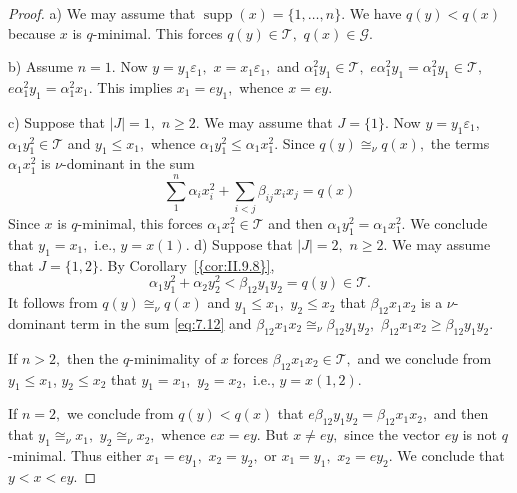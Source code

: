 \documentclass [12pt,a4paper,reqno]{amsart}
\begin{document}
\begin{proof} a) We may assume that ${\operatorname{supp}} (x)=\{1,\dots,n\}.$ We have $q(y)<q(x)$ because $x$ is $q$-minimal. This forces $q(y)\in {\mathcal T},$ $q(x)\in{\mathcal G}.$ {\vskip 1.5mm \noindent}

b) Assume $n=1.$ Now $y=y_1{\varepsilon}_1,$ $x=x_1{\varepsilon}_1,$ and ${\alpha}_1^2y_1\in {\mathcal T} ,$ $e{\alpha}_1^2y_1={\alpha}_1^2y_1\in{\mathcal T},$ $e{\alpha}_1^2y_1={\alpha}_1^2x_1.$ This implies $x_1=ey_1,$ whence $x=ey.$
{\vskip 1.5mm \noindent}

c) Suppose that $| J |=1,$ $n\ge 2.$ We may assume that $J=\{1\}.$ Now $y=y_1{\varepsilon}_1,$ ${\alpha}_1y_1^2\in{\mathcal T}$ and $y_1\le x_1,$ whence ${\alpha}_1y_1^2\le {\alpha}_1x_1^2.$ Since $q(y)\cong_\nu q(x),$ the terms ${\alpha}_1x_1^2$ is $\nu$-dominant in the sum
\begin{equation}\label{eq:7.12}
\sum_1^n{\alpha}_ix_i^2+\sum_{i<j}{\beta}_{ij}x_ix_j=q(x)
\end{equation}
Since $x$ is $q$-minimal, this forces ${\alpha}_1x_1^2\in{\mathcal T}$ and then ${\alpha}_1y_1^2={\alpha}_1x_1^2.$ We conclude that $y_1=x_1,$ i.e., $y=x(1).$
{\vskip 1.5mm \noindent}
d) Suppose that $| J |=2,$ $n\ge 2.$ We may assume that $ J =\{1,2\}.$ By {Corollary~\ref{{cor:II.9.8}}}, $${\alpha}_1y_1^2+{\alpha}_2y_2^2<{\beta}_{12}y_1y_2 = q(y)\in {\mathcal T}.$$
It follows from $q(y)\cong_\nu q(x)$ and $y_1\le x_1,$ $y_2\le x_2 $ that ${\beta}_{12}x_1x_2$ is a $\nu$-dominant term in the sum \eqref{eq:7.12} and ${\beta}_{12}x_1x_2\cong_\nu{\beta}_{12}y_1 y_{2},$ ${\beta}_{12}x_1x_2\ge{\beta}_{12}y_1y_2.$

If $n>2,$ then the $q$-minimality of $x$ forces ${\beta}_{12}x_1x_2\in {\mathcal T},$ and we conclude from $y_1\le x_1$, $y_2\le x_2$ that $y_1=x_1,$ $y_2=x_2,$ i.e., $y=x(1,2).$

If $n=2,$ we conclude from $q(y)<q(x)$ that $e {\beta}_{12}y_1y_2={\beta}_{12}x_1x_2,$ and then that $y_1\cong_\nu x_1,$ $y_2\cong_\nu x_2,$ whence $ex=ey.$
But $x\ne ey,$ since the vector $ey$ is not $q$-minimal. Thus either $x_1=ey_1,$ $x_2=y_2,$ or $x_1=y_1,$ $x_2=ey_2.$ We conclude that $y<x<ey.$
\end{proof}
\end{document}
